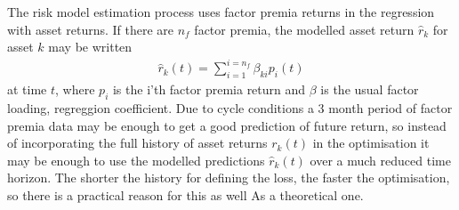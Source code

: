 \documentclass[12pt]{article}
\begin{document}
The risk model estimation process uses factor premia returns in the regression
with asset returns. If there are $n_f$ factor premia, the modelled asset return $\hat{r}_{k}$ for asset $k$ may be written
\begin{eqnarray}
    \hat{r}_{k}(t) = \sum_{i=1}^{i=n_f}\beta_{ki} p_{i}(t)
\end{eqnarray}
at time $t$, where $p_i$ is the i'th factor premia return and $\beta$ is the usual factor loading, regreggion coefficient.
Due to cycle conditions a 3 month period of factor premia data may be enough
to get a good prediction of future return, so instead of incorporating the full history of
asset returns $r_k(t)$ in the optimisation it may be enough to use the modelled predictions
$\hat{r}_{k}(t)$ over a much reduced time horizon. The shorter the history for defining the
loss, the faster the optimisation, so there is a practical reason for this as well As
a theoretical one.
\end{document}

